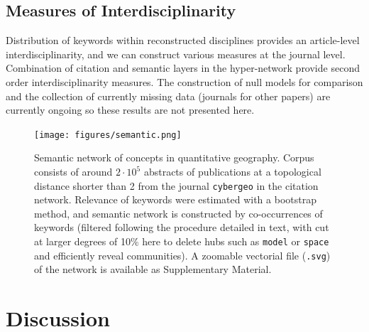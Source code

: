 \subsection{Measures of Interdisciplinarity}





Distribution of keywords within reconstructed disciplines provides an article-level interdisciplinarity, and we can construct various measures at the journal level. Combination of citation and semantic layers in the hyper-network provide second order interdisciplinarity measures. The construction of null models for comparison and the collection of currently missing data (journals for other papers) are currently ongoing so these results are not presented here.







\begin{figure}
\hspace{-2cm}
\texttt{[image: figures/semantic.png]}
\caption[Semantic network of concepts in quantitative geography]{Semantic network of concepts in quantitative geography. Corpus consists of around $2\cdot 10^5$ abstracts of publications at a topological distance shorter than 2 from the journal \texttt{cybergeo} in the citation network. Relevance of keywords were estimated with a bootstrap method, and semantic network is constructed by co-occurrences of keywords (filtered following the procedure detailed in text, with cut at larger degrees of 10\% here to delete hubs such as \texttt{model} or \texttt{space} and efficiently reveal communities). A zoomable vectorial file (\texttt{.svg}) of the network is available as Supplementary Material.}
\label{fig:quantepistemo:semanticnw}
\end{figure}










\section{Discussion}
\label{sec:discussion}










